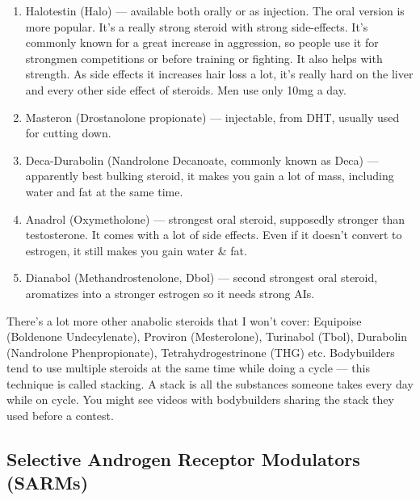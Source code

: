 \documentclass[openany, 12pt]{book}
\begin{document}
\begin{enumerate}
		\item Halotestin (Halo) --- available both orally or as injection. The oral version is more popular. It's a really strong steroid with strong side-effects.
                  It's commonly known for a great increase in aggression, so people use it for strongmen competitions or before training or fighting.
                  It also helps with strength. As side effects it increases hair loss a lot, it's really hard on the liver
                  and every other side effect of steroids. Men use only 10mg a day.

		\item Masteron (Drostanolone propionate) --- injectable, from DHT, usually used for cutting down.

		\item Deca-Durabolin (Nandrolone Decanoate, commonly known as Deca) --- apparently best bulking steroid, it makes you gain a lot of mass, including water and fat at the same time.

		\item Anadrol (Oxymetholone) --- strongest oral steroid, supposedly stronger than testosterone. It comes with a lot of side effects. Even if it doesn't convert to estrogen, it still
                  makes you gain water \& fat.
                  
		\item Dianabol (Methandrostenolone, Dbol) --- second strongest oral steroid, aromatizes into a stronger estrogen so it needs strong AIs.

	\end{enumerate}

        There's a lot more other anabolic steroids that I won't cover: Equipoise (Boldenone Undecylenate), Proviron (Mesterolone), Turinabol (Tbol), Durabolin (Nandrolone Phenpropionate),
        Tetrahydrogestrinone (THG) etc. Bodybuilders tend to use multiple steroids at the same time while doing a cycle --- this technique is called stacking.
        A stack is all the substances someone takes every day while on cycle. You might see videos with bodybuilders sharing the stack they used before a contest.

        \FloatBarrier
        
        \subsection{Selective Androgen Receptor Modulators (SARMs)}
\end{document}
